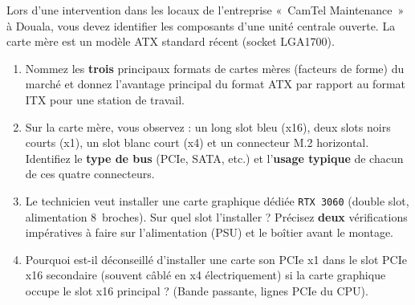 \documentclass[11pt]{article}
\begin{document}
\begin{exercice}
Lors d'une intervention dans les locaux de l'entreprise «~CamTel Maintenance~» à Douala, vous devez identifier les composants d'une unité centrale ouverte. La carte mère est un modèle ATX standard récent (socket LGA1700).
\begin{enumerate}
    \item Nommez les \textbf{trois} principaux formats de cartes mères (facteurs de forme) du marché et donnez l'avantage principal du format ATX par rapport au format ITX pour une station de travail.
    \item Sur la carte mère, vous observez : un long slot bleu (x16), deux slots noirs courts (x1), un slot blanc court (x4) et un connecteur M.2 horizontal. Identifiez le \textbf{type de bus} (PCIe, SATA, etc.) et l'\textbf{usage typique} de chacun de ces quatre connecteurs.
    \item Le technicien veut installer une carte graphique dédiée \texttt{RTX 3060} (double slot, alimentation 8~broches). Sur quel slot l'installer ? Précisez \textbf{deux} vérifications impératives à faire sur l'alimentation (PSU) et le boîtier avant le montage.
    \item Pourquoi est-il déconseillé d'installer une carte son PCIe x1 dans le slot PCIe x16 secondaire (souvent câblé en x4 électriquement) si la carte graphique occupe le slot x16 principal ? (Bande passante, lignes PCIe du CPU).
\end{enumerate}
\end{exercice}
\end{document}
